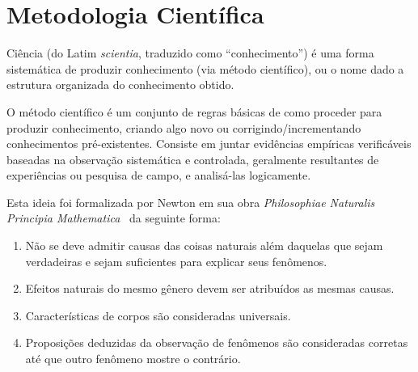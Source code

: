 \section{Metodologia Científica}%
Ciência (do Latim \emph{scientia}, traduzido como ``conhecimento'') é uma forma
sistemática de produzir conhecimento (via método científico), ou o nome dado a
estrutura organizada do conhecimento obtido.

O método científico é um conjunto de regras básicas de como proceder para produzir
conhecimento, criando algo novo ou corrigindo/incrementando conhecimentos
pré-existentes. Consiste em juntar evidências empíricas verificáveis baseadas na
observação sistemática e controlada, geralmente resultantes de experiências ou
pesquisa de campo, e analisá-las logicamente.

Esta ideia foi formalizada por Newton em sua obra \emph{Philosophiae Naturalis
Principia Mathematica}~\cite{newton1833philosophiae} da seguinte forma:
\begin{enumerate}
	\item Não se deve admitir causas das coisas naturais além daquelas
	que sejam verdadeiras e sejam suficientes para explicar seus fenômenos.
	\item Efeitos naturais do mesmo gênero devem ser atribuídos as mesmas causas.
	\item Características de corpos são consideradas universais.
	\item Proposições deduzidas da observação de fenômenos são
	consideradas corretas até que outro fenômeno mostre o contrário.
\end{enumerate}%

